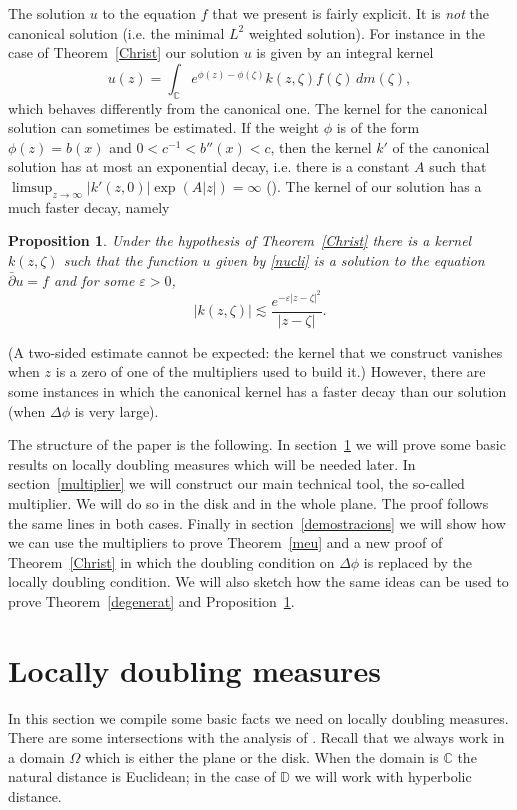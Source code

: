 \documentclass[12pt,twoside,final,psamsfonts]{amsart}
\theoremstyle{plain}
\newtheorem{prop}{Proposition}
\theoremstyle{remark}
\theoremstyle{definition}
\newcommand{\C}{{\mathbb C}}
\newcommand{\D}{{\mathbb D}}
\newcommand{\dbar}{\bar\partial}
\begin{document}
The solution $u$ to the equation $f$ that we present is fairly explicit. It is
\emph{not} the canonical solution (i.e. the minimal $L^2$ weighted solution).
For instance in the case of Theorem~\ref{Christ} our
solution $u$ is given by an integral kernel
\begin{equation}\label{nucli}
u(z)=\int_\C e^{\phi(z)-\phi(\zeta)}k(z,\zeta) f(\zeta)\, dm(\zeta),
\end{equation}
which behaves differently from the canonical one. The kernel for the canonical
solution can sometimes be estimated. If the weight $\phi$ is of the form
$\phi(z)=b(x)$ and $0<c^{-1}<b''(x) <c$, then the kernel $k'$ of the canonical
solution has at most an exponential decay, i.e. there is a constant $A$ such
that $\limsup_{z\to\infty} |k'(z,0)|\exp(A|z|)=\infty$ 
(\cite[Proposition~1.18]{Christ91}). 
The kernel of our
solution has a much faster decay, namely 
\begin{prop}\label{churrimangui} 
Under the hypothesis of Theorem~\ref{Christ} there is a kernel
$k(z,\zeta)$ such that the function $u$ given by \eqref{nucli} is a solution to
the equation $\dbar u= f$ and for some $\varepsilon>0$,
\[
|k(z,\zeta)|\lesssim \frac{e^{-\varepsilon |z-\zeta|^2}}{|z-\zeta|}.
\]
\end{prop}
(A two-sided estimate cannot be expected: the kernel that we construct
vanishes when $z$ is a zero of one of the multipliers used to build it.)
However, there are some instances in which the canonical kernel has a faster
decay than our solution (when $\Delta \phi$ is very large). 

The structure of the paper is the following. In section~\ref{doubling} we will
prove some basic results on locally 
doubling measures which will be needed later. In
section~\ref{multiplier} we will construct our main technical tool, the
so-called multiplier. We will do so in the disk and in the whole plane. The
proof follows the same lines in both cases. 
Finally in
section~\ref{demostracions} we will show how we can use the multipliers to prove
Theorem~\ref{meu} and a new proof of 
Theorem~\ref{Christ} in which the doubling condition on $\Delta\phi$
is replaced by the locally
doubling condition. We will also sketch
how the same ideas can be used to prove Theorem~\ref{degenerat} and
Proposition~\ref{churrimangui}.

\section{Locally doubling measures}\label{doubling}
In this section we compile some basic facts we need on locally doubling 
measures. There are some intersections with the analysis of
\cite{Christ91}.  Recall that we always work in a domain $\Omega$ which is
either the plane or the disk. When the domain is $\C$ the natural distance is
Euclidean; in the case of $\D$ we will work with hyperbolic
distance. 
\end{document}
